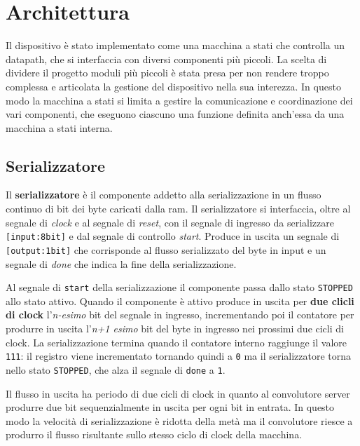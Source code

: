 \documentclass[a4paper]{report}
\begin{document}

\chapter{Architettura}
Il dispositivo è stato implementato come una macchina a stati che controlla un datapath, che si interfaccia con diversi componenti più piccoli. La scelta di dividere il progetto moduli più piccoli è stata presa per non rendere troppo complessa e articolata la gestione del dispositivo nella sua interezza. In questo modo la macchina a stati si limita a gestire la comunicazione e coordinazione dei vari componenti, che eseguono ciascuno una funzione definita anch'essa da una macchina a stati interna.

\section{Serializzatore}

Il \textbf{serializzatore} è il componente addetto alla serializzazione in un flusso continuo di bit dei byte caricati dalla ram.
Il serializzatore si interfaccia, oltre al segnale di \textit{clock} e al segnale di \textit{reset}, con il segnale di ingresso da serializzare \texttt{[input:8bit]} e dal segnale di controllo \textit{start}. Produce in uscita un segnale di \texttt{[output:1bit]} che corrisponde al flusso serializzato del byte in input e un segnale di \textit{done} che indica la fine della serializzazione.

Al segnale di \texttt{start} della serializzazione il componente passa dallo stato \texttt{STOPPED} allo stato attivo. Quando il componente è attivo produce in uscita per \textbf{due clicli di clock} l'\textit{n-esimo} bit del segnale in ingresso, incrementando poi il contatore per produrre in uscita l'\textit{n+1 esimo} bit del byte in ingresso nei prossimi due cicli di clock. La serializzazione termina quando il contatore interno raggiunge il valore \texttt{111}: il registro viene incrementato tornando quindi a \texttt{0} ma il serializzatore torna nello stato \texttt{STOPPED}, che alza il segnale di \texttt{done} a \texttt{1}.

Il flusso in uscita ha periodo di due cicli di clock in quanto al convolutore server produrre due bit sequenzialmente in uscita per ogni bit in entrata. In questo modo la velocità di serializzazione è ridotta della metà ma il convolutore riesce a produrro il flusso risultante sullo stesso ciclo di clock della macchina.
\end{document}
